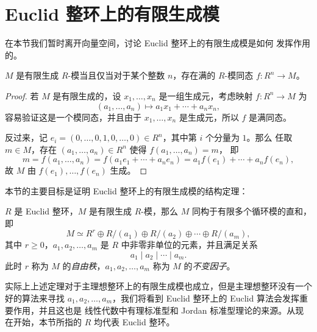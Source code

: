 \documentclass[fontset=none,zihao=-4]{Notes}
\begin{document}
\section{Euclid 整环上的有限生成模}

在本节我们暂时离开向量空间，讨论 Euclid 整环上的有限生成模是如何
发挥作用的。

\begin{lemma}\label{lemma:finite generated module}
  $M$ 是有限生成 $R$-模当且仅当对于某个整数 $n$，存在满的 $R$-模同态 
  $f:R^n\to M$。
\end{lemma}
\begin{proof}
  若 $M$ 是有限生成的，设 $x_1,\dots,x_n$ 是一组生成元，考虑映射 $f:R^n\to M$ 为
  \[
    (a_1,\dots,a_n)\mapsto a_1x_1+\cdots+a_nx_n,
  \]
  容易验证这是一个模同态，并且由于 $x_1,\dots,x_n$ 是生成元，所以 $f$ 是满同态。

  反过来，记 $e_i=(0,\dots,0,1,0,\dots,0)\in R^n$，其中第 $i$ 个分量为 $1$。那么
  任取 $m\in M$，存在 $(a_1,\dots,a_n)\in R^n$ 使得 $f(a_1,\dots,a_n)=m$，
  即
  \[
    m=f(a_1,\dots,a_n)=f(a_1e_1+\cdots+a_ne_n)
    =a_1f(e_1)+\cdots+a_nf(e_n),  
  \]
  故 $M$ 由 $f(e_1),\dots,f(e_n)$ 生成。
\end{proof}

本节的主要目标是证明 Euclid 整环上的有限生成模的结构定理：

\begin{theorem}\label{thm:invariant form}
  $R$ 是 Euclid 整环，$M$ 是有限生成 $R$-模，那么 $M$ 同构于有限多个循环模的直和，即
  \[
    M\simeq R^r\oplus R/(a_1)\oplus R/(a_2)\oplus\cdots  \oplus R/(a_m),
  \]
  其中 $r\geq 0$，$a_1,a_2,\dots,a_m$ 是 $R$ 中非零非单位的元素，并且满足关系
  \[
    a_1\mid a_2\mid\cdots\mid a_m.  
  \]
  此时 $r$ 称为 $M$ 的\emph{自由秩}，$a_1,a_2,\dots,a_m$ 称为 $M$ 的\emph{不变因子}。
\end{theorem}

实际上上述定理对于主理想整环上的有限生成模也成立，但是主理想整环没有一个好的算法来寻找
$a_1,a_2,\dots,a_m$，我们将看到 Euclid 整环上的 Euclid 算法会发挥重要作用，并且这也是
线性代数中有理标准型和 Jordan 标准型理论的来源。从现在开始，本节所指的
$R$ 均代表 Euclid 整环。
\end{document}
